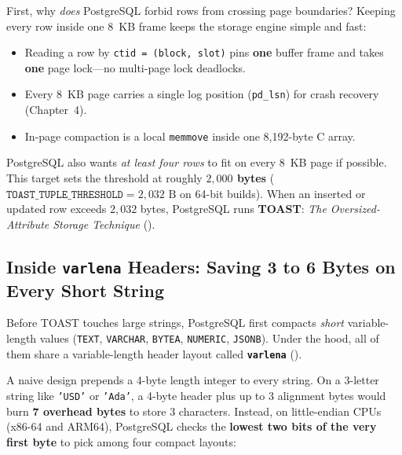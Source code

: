 First, why \emph{does} PostgreSQL forbid rows from crossing page boundaries? Keeping every row inside one 8~KB frame keeps the storage engine simple and fast:
\begin{itemize}
  \item Reading a row by \texttt{ctid = (block, slot)} pins \textbf{one} buffer frame and takes \textbf{one} page lock---no multi-page lock deadlocks.
  \item Every 8~KB page carries a single log position (\texttt{pd\_lsn}) for crash recovery (Chapter~4).
  \item In-page compaction is a local \texttt{memmove} inside one 8,192-byte C array.
\end{itemize}
PostgreSQL also wants \emph{at least four rows} to fit on every 8~KB page if possible. This target sets the threshold at roughly \textbf{$2{,}000$ bytes} ($\texttt{TOAST\_TUPLE\_THRESHOLD} = 2{,}032\text{ B}$ on 64-bit builds). When an inserted or updated row exceeds $2{,}032$ bytes, PostgreSQL runs \textbf{TOAST}: \emph{The Oversized-Attribute Storage Technique} ().

\subsection{Inside \texttt{varlena} Headers: Saving 3 to 6 Bytes on Every Short String}

Before TOAST touches large strings, PostgreSQL first compacts \emph{short} variable-length values (\texttt{TEXT}, \texttt{VARCHAR}, \texttt{BYTEA}, \texttt{NUMERIC}, \texttt{JSONB}). Under the hood, all of them share a variable-length header layout called \textbf{\texttt{varlena}} ().

A naive design prepends a 4-byte length integer to every string. On a 3-letter string like \texttt{'USD'} or \texttt{'Ada'}, a 4-byte header plus up to 3 alignment bytes would burn \textbf{7 overhead bytes} to store 3 characters. Instead, on little-endian CPUs (x86-64 and ARM64), PostgreSQL checks the \textbf{lowest two bits of the very first byte} to pick among four compact layouts:

